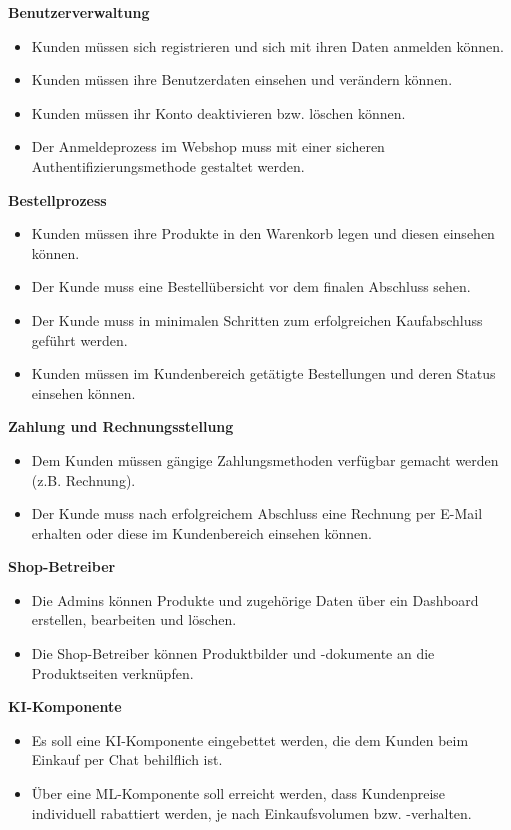 \documentclass[%
	ngerman,
	12pt,
	a4paper,
	oneside,
	parskip=full
]{scrbook}
\begin{document}
	\vspace{0.5cm}
	\textbf{Benutzerverwaltung}
	\begin{itemize}
		\item Kunden müssen sich registrieren und sich mit ihren Daten anmelden können.
		\item Kunden müssen ihre Benutzerdaten einsehen und verändern können.
		\item Kunden müssen ihr Konto deaktivieren bzw. löschen können.
		\item Der Anmeldeprozess im Webshop muss mit einer sicheren Authentifizierungsmethode gestaltet werden.
	\end{itemize}

	\vspace{0.5cm}
	\textbf{Bestellprozess}
	\begin{itemize}
		\item Kunden müssen ihre Produkte in den Warenkorb legen und diesen einsehen können.
		\item Der Kunde muss eine Bestellübersicht vor dem finalen Abschluss sehen.
		\item Der Kunde muss in minimalen Schritten zum erfolgreichen Kaufabschluss geführt werden.
		\item Kunden müssen im Kundenbereich getätigte Bestellungen und deren Status einsehen können.
	\end{itemize}

	\vspace{0.5cm}
	\textbf{Zahlung und Rechnungsstellung}
	\begin{itemize}
		\item Dem Kunden müssen gängige Zahlungsmethoden verfügbar gemacht werden (z.B. Rechnung).
		\item Der Kunde muss nach erfolgreichem Abschluss eine Rechnung per E-Mail erhalten oder diese im Kundenbereich einsehen können.
	\end{itemize}

	\vspace{0.5cm}
	\textbf{Shop-Betreiber}
	\begin{itemize}
		\item Die Admins können Produkte und zugehörige Daten über ein Dashboard erstellen, bearbeiten und löschen.
		\item Die Shop-Betreiber können Produktbilder und -dokumente an die Produktseiten verknüpfen.
	\end{itemize}

	\vspace{0.5cm}
	\textbf{KI-Komponente}
	\begin{itemize}
		\item Es soll eine KI-Komponente eingebettet werden, die dem Kunden beim Einkauf per Chat behilflich ist.
		\item Über eine ML-Komponente soll erreicht werden, dass Kundenpreise individuell rabattiert werden, je nach Einkaufsvolumen bzw. -verhalten.
	\end{itemize}
\end{document}
